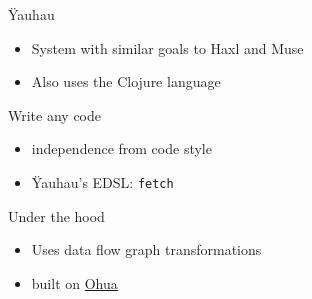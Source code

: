 \begin{frame}[fragile]{Ÿauhau}

\begin{Shaded}
\begin{Highlighting}[]
   \NormalTok{(} 

\end{Highlighting}
\end{Shaded}

\begin{itemize}[<+->]
\tightlist
\item
  System with similar goals to Haxl and Muse
\item
  Also uses the Clojure language
\end{itemize}

\end{frame}

\begin{frame}[fragile]

\begin{block}{Write any code}

\begin{Shaded}
\begin{Highlighting}[]
  \NormalTok{(} \NormalTok{[fx (friends-of x)}
        \NormalTok{fy (friends-of y)])}
   \NormalTok{(} 
\end{Highlighting}
\end{Shaded}

\begin{itemize}[<+->]
\tightlist
\item
  independence from code style
\item
  Ÿauhau's EDSL: \texttt{fetch}
\end{itemize}

\end{block}

\end{frame}

\begin{frame}

\begin{block}{Under the hood}

\begin{itemize}[<+->]
\tightlist
\item
  Uses data flow graph transformations
\item
  built on \href{https://bitbucket.org/sertel/ohua}{Ohua}
\end{itemize}

\end{block}

\end{frame}

